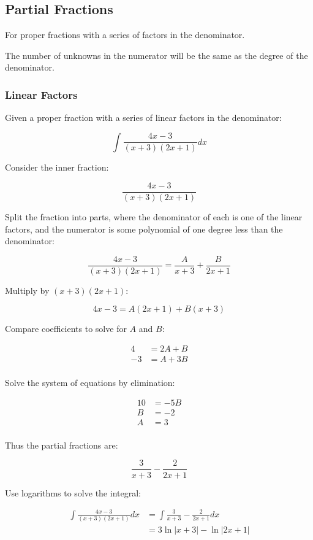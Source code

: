 \documentclass[a4paper,11pt]{article}
\begin{document}
\subsection{Partial Fractions}

For proper fractions with a series of factors in the denominator.

The number of unknowns in the numerator will be the same as the degree of the
denominator.


\subsubsection{Linear Factors}

Given a proper fraction with a series of linear factors in the denominator:

$$
\int \frac{4x - 3}{(x + 3)(2x + 1)} dx
$$

Consider the inner fraction:

$$
\frac{4x - 3}{(x + 3)(2x + 1)}
$$

Split the fraction into parts, where the denominator of each is one of the
linear factors, and the numerator is some polynomial of one degree less than
the denominator:

$$
\frac{4x - 3}{(x + 3)(2x + 1)} = \frac{A}{x + 3} + \frac{B}{2x + 1}
$$

Multiply by $(x + 3)(2x + 1)$:

$$
4x - 3 = A(2x + 1) + B(x + 3)
$$

Compare coefficients to solve for $A$ and $B$:

$$
\begin{aligned}
4 & = 2A + B \\
-3 & = A + 3B \\
\end{aligned}
$$

Solve the system of equations by elimination:

$$
\begin{aligned}
10 & = -5B \\
B & = -2 \\
A & = 3 \\
\end{aligned}
$$

Thus the partial fractions are:

$$
\frac{3}{x + 3} - \frac{2}{2x + 1}
$$

Use logarithms to solve the integral:

$$
\begin{aligned}
\int \frac{4x - 3}{(x + 3)(2x + 1)} dx & = \int \frac{3}{x + 3} - \frac{2}{2x + 1} dx \\
& = 3\ln{|x + 3|} - \ln{|2x + 1|} \\
\end{aligned}
$$
\end{document}
